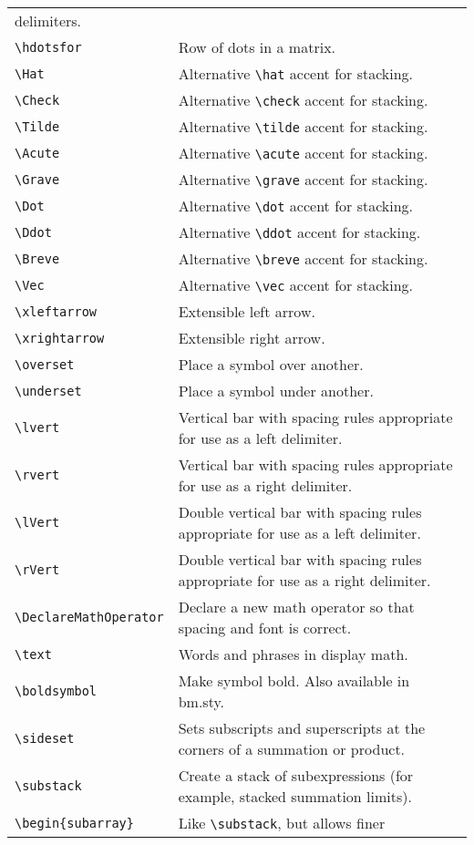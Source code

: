 \documentclass[twocolumn,secnumarabic,amssymb, amsmath, nofootinbib,tightenlines,
nobibnotes, aps, prl]{revtex4}
\begin{document}
\begin{longtable*}{@{\extracolsep{1in}}p{3in}p{3in}}
delimiters.\\
\verb+\hdotsfor+ & Row of dots in a matrix.\\
\verb+\Hat+ & Alternative \verb+\hat+ accent for stacking.\\
\verb+\Check+ & Alternative \verb+\check+ accent for stacking.\\
\verb+\Tilde+ & Alternative \verb+\tilde+ accent for stacking.\\
\verb+\Acute+ & Alternative \verb+\acute+ accent for stacking.\\
\verb+\Grave+ & Alternative \verb+\grave+ accent for stacking.\\
\verb+\Dot+ & Alternative \verb+\dot+ accent for stacking.\\
\verb+\Ddot+ & Alternative \verb+\ddot+ accent for stacking.\\
\verb+\Breve+ & Alternative \verb+\breve+ accent for stacking.\\
\verb+\Vec+ & Alternative \verb+\vec+ accent for stacking.\\
\verb+\xleftarrow+ & Extensible left arrow.\\
\verb+\xrightarrow+ & Extensible right arrow.\\
\verb+\overset+ & Place a symbol over another.\\
\verb+\underset+ & Place a symbol under another.\\
\verb+\lvert+ & Vertical bar with spacing rules appropriate for use as
a left delimiter.\\
\verb+\rvert+ & Vertical bar with spacing rules appropriate for use as
a right delimiter.\\
\verb+\lVert+ & Double vertical bar with spacing rules appropriate for use as
a left delimiter.\\
\verb+\rVert+ & Double vertical bar with spacing rules appropriate for use as
a right delimiter.\\
\verb+\DeclareMathOperator+ & Declare a new math operator so that
spacing and font is correct.\\
\verb+\text+ & Words and phrases in display math.\\
\verb+\boldsymbol+ & Make symbol bold. Also available in bm.sty.\\
\verb+\sideset+ & Sets subscripts and superscripts at the corners of a
summation or product.\\
\verb+\substack+ & Create a stack of subexpressions (for example,
stacked summation limits).\\
\verb+\begin{subarray}+ & Like \verb+\substack+, but allows finer

\end{longtable*}
\end{document}
